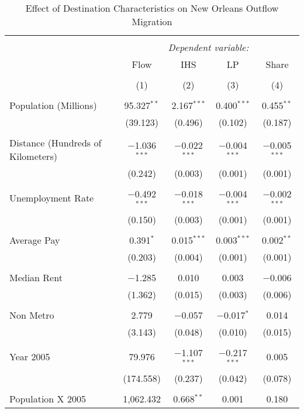 \documentclass[]{article}
\begin{document}
\begin{table}[!htbp] \centering 
  \caption{\label{reg:regmain}Effect of Destination Characteristics on New Orleans Outflow Migration} 
  \label{} 
\scriptsize 
\begin{tabular}{@{\extracolsep{5pt}}lcccc} 
\\[-1.8ex]\hline 
\hline \\[-1.8ex] 
 & \multicolumn{4}{c}{\textit{Dependent variable:}} \\ 
\cline{2-5} 
 & Flow & IHS & LP & Share \\ 
\\[-1.8ex] & (1) & (2) & (3) & (4)\\ 
\hline \\[-1.8ex] 
 Population (Millions) & 95.327$^{**}$ & 2.167$^{***}$ & 0.400$^{***}$ & 0.455$^{**}$ \\ 
  & (39.123) & (0.496) & (0.102) & (0.187) \\ 
  & & & & \\ 
 Distance (Hundreds of Kilometers) & $-$1.036$^{***}$ & $-$0.022$^{***}$ & $-$0.004$^{***}$ & $-$0.005$^{***}$ \\ 
  & (0.242) & (0.003) & (0.001) & (0.001) \\ 
  & & & & \\ 
 Unemployment Rate & $-$0.492$^{***}$ & $-$0.018$^{***}$ & $-$0.004$^{***}$ & $-$0.002$^{***}$ \\ 
  & (0.150) & (0.003) & (0.001) & (0.001) \\ 
  & & & & \\ 
 Average Pay & 0.391$^{*}$ & 0.015$^{***}$ & 0.003$^{***}$ & 0.002$^{**}$ \\ 
  & (0.203) & (0.004) & (0.001) & (0.001) \\ 
  & & & & \\ 
 Median Rent & $-$1.285 & 0.010 & 0.003 & $-$0.006 \\ 
  & (1.362) & (0.015) & (0.003) & (0.006) \\ 
  & & & & \\ 
 Non Metro & 2.779 & $-$0.057 & $-$0.017$^{*}$ & 0.014 \\ 
  & (3.143) & (0.048) & (0.010) & (0.015) \\ 
  & & & & \\ 
 Year 2005 & 79.976 & $-$1.107$^{***}$ & $-$0.217$^{***}$ & 0.005 \\ 
  & (174.558) & (0.237) & (0.042) & (0.078) \\ 
  & & & & \\ 
 Population X 2005 & 1,062.432 & 0.668$^{**}$ & 0.001 & 0.180 \\ 

\end{tabular}
\end{table}
\end{document}
